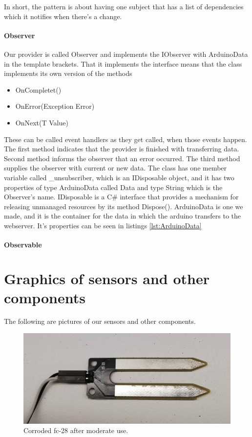 \documentclass[a4paper,12pt,twoside,openright,titlepage]{book}
\begin{document}
In short, the pattern is about having one subject that has a list of dependencies which it notifies when there's a change.

\subsubsection{Observer}
Our provider is called Observer and implements the IObserver with ArduinoData in the template brackets. That it implements the interface means that the class implements its own version of the methods
\begin{itemize}
\item OnCompletet()
\item OnError(Exception Error)
\item OnNext(T Value)
\end{itemize}

These can be called event handlers as they get called, when those events happen. The first method indicates that the provider is finished with transferring data. Second method informs the observer that an error occurred. The third method supplies the observer with current or new data. 
The class has one member variable called \_unsubscriber, which is an IDisposable object, and it has two properties of type ArduinoData called Data and type String which is the Observer's name. IDisposable is a C\# interface that provides a mechanism for releasing unmanaged resources by its method Dispose(). ArduinoData is one we made, and it is the container for the data in which the arduino transfers to the webserver. It's properties can be seen in listings \ref{lst:ArduinoData}

\subsubsection{Observable}


\appendix

\chapter{Graphics of sensors and other components}
The following are pictures of our sensors and other components.

\begin{figure}[!ht]
  \centering
      \includegraphics{fc-28-corrosion}
  \caption{Corroded fc-28 after moderate use.}
  \label{fig:resistive}
\end{figure}
\end{document}
